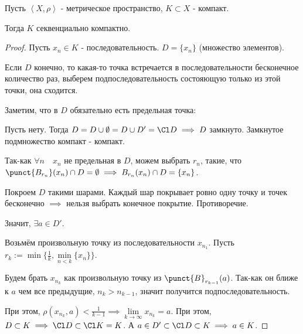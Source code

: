\begin{theorem} \thmslashn

    Пусть $\left<X, \rho\right>$ - метрическое пространство, $K \subset X$ - компакт.

    Тогда $K$ секвенциально компактно.
    \begin{proof} \thmslashn
    
        Пусть $x_{n}\in K$ - последовательность. $D = \{x_{n}\}$ (множество элементов).

        Если $D$ конечно, то какая-то точка встречается в последовательности бесконечное количество раз, выберем подпоследовательность состояющую только из этой точки, она сходится.

        Заметим, что в $D$ обязательно есть предельная точка:

        Пусть нету. Тогда $D = D \cup \emptyset = D \cup D' = \Cl D \implies D$ замкнуто. Замкнутое подмножество компакт - компакт.

        Так-как $\forall{n}\quad x_{n}$ не предельная в $D$, можем выбрать $r_{n}$, такие, что $\punct{B_{r_{n}}}(x_{n})\cap D = \emptyset \implies B_{r_{n}}(x_{n})\cap D = \{x_{n}\} $.

        Покроем $D$ такими шарами. Каждый шар покрывает ровно одну точку и точек бесконечно $\implies$ нельзя выбрать конечное покрытие. Противоречие.

        Значит, $\exists{a\in D'}$.

        Возьмём произвольную точку из последовательности $x_{n_1}$. Пусть $r_{k} := \min \{\frac{1}{k}, \min\limits_{n < k} \{x_{n}\} \} $.

        Будем брать $x_{n_{k}}$ как произвольную точку из $\punct{B}_{r_{k-1}}(a)$. Так-как он ближе к $a$ чем все предыдущие, $n_{k} > n_{k-1}$, значит получится подпоследовательность.

        При этом, $\rho(x_{n_{k}}, a) < \frac{1}{k - 1} \implies \lim\limits_{k \to \infty} x_{n_{k}} = a$. При этом, $D \subset K \implies \Cl D \subset \Cl K = K$. А $a\in D' \subset \Cl D \subset K \implies a\in K$.
    \end{proof}
\end{theorem}
